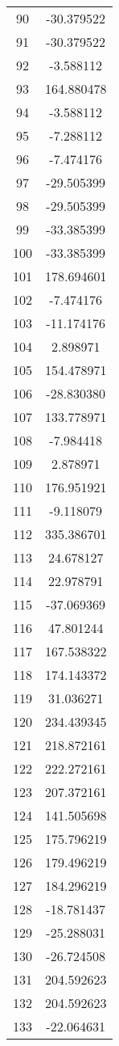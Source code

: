\documentclass[12pt]{article}
\begin{document}
\begin{longtable}{@{}cc@{}}
90 & -30.379522 \\
91 & -30.379522 \\
92 & -3.588112 \\
93 & 164.880478 \\
94 & -3.588112 \\
95 & -7.288112 \\
96 & -7.474176 \\
97 & -29.505399 \\
98 & -29.505399 \\
99 & -33.385399 \\
100 & -33.385399 \\
101 & 178.694601 \\
102 & -7.474176 \\
103 & -11.174176 \\
104 & 2.898971 \\
105 & 154.478971 \\
106 & -28.830380 \\
107 & 133.778971 \\
108 & -7.984418 \\
109 & 2.878971 \\
110 & 176.951921 \\
111 & -9.118079 \\
112 & 335.386701 \\
113 & 24.678127 \\
114 & 22.978791 \\
115 & -37.069369 \\
116 & 47.801244 \\
117 & 167.538322 \\
118 & 174.143372 \\
119 & 31.036271 \\
120 & 234.439345 \\
121 & 218.872161 \\
122 & 222.272161 \\
123 & 207.372161 \\
124 & 141.505698 \\
125 & 175.796219 \\
126 & 179.496219 \\
127 & 184.296219 \\
128 & -18.781437 \\
129 & -25.288031 \\
130 & -26.724508 \\
131 & 204.592623 \\
132 & 204.592623 \\
133 & -22.064631 \\

\end{longtable}
\end{document}
